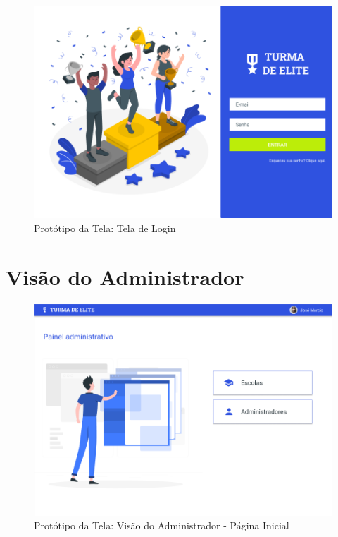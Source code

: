 \begin{apendicesenv}
\begin{figure}[htb]
    \centering
	\includegraphics[width=16cm]{imagens/Geral-Login.png}
	\caption{\label{fig:login} Protótipo da Tela: Tela de Login}
\end{figure}
\FloatBarrier


\section{Visão do Administrador}

\begin{figure}[htb]
    \centering
	\includegraphics[width=16cm]{imagens/Administrador-PaginaInicial.png}
	\caption{\label{fig:administrador} Protótipo da Tela: Visão do Administrador - Página Inicial}
\end{figure}
\FloatBarrier


\end{apendicesenv}
